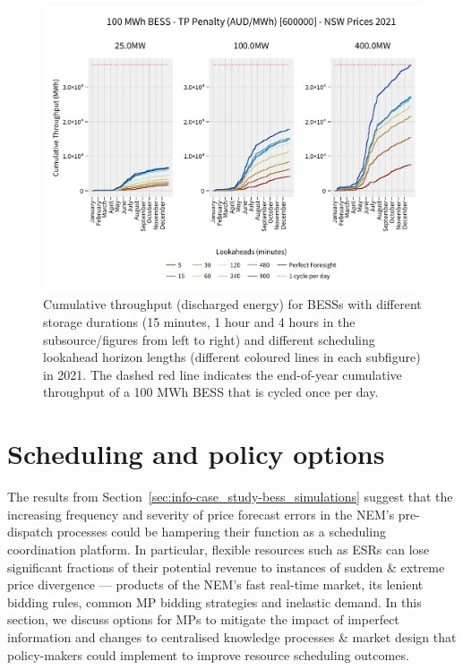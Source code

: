 \documentclass[12pt,a4paper,]{report}
\begin{document}
\begin{figure}
\hypertarget{fig:bess_throughputs}{%
\centering
\includegraphics{source/figures/NSW_100_arbitrage_throughputpenalty_no_degradation_600000_throughputs.pdf}
\caption{Cumulative throughput (discharged energy) for BESSs with
different storage durations (15 minutes, 1 hour and 4 hours in the
subsource/figures from left to right) and different scheduling lookahead
horizon lengths (different coloured lines in each subfigure) in 2021.
The dashed red line indicates the end-of-year cumulative throughput of a
100 MWh BESS that is cycled once per day.}\label{fig:bess_throughputs}
}
\end{figure}

\hypertarget{sec:info-discussion}{%
\section{Scheduling and policy options}\label{sec:info-discussion}}

The results from Section~\ref{sec:info-case_study-bess_simulations}
suggest that the increasing frequency and severity of price forecast
errors in the NEM's pre-dispatch processes could be hampering their
function as a scheduling coordination platform. In particular, flexible
resources such as ESRs can lose significant fractions of their potential
revenue to instances of sudden \& extreme price divergence --- products
of the NEM's fast real-time market, its lenient bidding rules, common MP
bidding strategies and inelastic demand. In this section, we discuss
options for MPs to mitigate the impact of imperfect information and
changes to centralised knowledge processes \& market design that
policy-makers could implement to improve resource scheduling outcomes.
\end{document}
